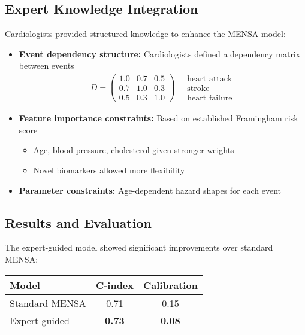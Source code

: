 \subsection{Expert Knowledge Integration}

Cardiologists provided structured knowledge to enhance the MENSA model:

\begin{itemize}
    \item \textbf{Event dependency structure:}
    Cardiologists defined a dependency matrix between events
    \begin{align}
        D =
        \begin{pmatrix}
            1.0 & 0.7 & 0.5 \\
            0.7 & 1.0 & 0.3 \\
            0.5 & 0.3 & 1.0
        \end{pmatrix}
        \quad
        \begin{array}{c}
            \text{heart attack} \\
            \text{stroke} \\
            \text{heart failure}
        \end{array}
    \end{align}

    \item \textbf{Feature importance constraints:} 
    Based on established Framingham risk score
    \begin{itemize}
        \item Age, blood pressure, cholesterol given stronger weights
        \item Novel biomarkers allowed more flexibility
    \end{itemize}

    \item \textbf{Parameter constraints:} 
    Age-dependent hazard shapes for each event
\end{itemize}

\subsection{Results and Evaluation}

The expert-guided model showed significant improvements over standard MENSA:

\begin{center}
    \begin{tabular}{l|cc}
        \hline
        Model & C-index & Calibration \\
        \hline
        Standard MENSA & 0.71 & 0.15 \\
        Expert-guided & \textbf{0.73} & \textbf{0.08} \\
        \hline
    \end{tabular}
\end{center}

